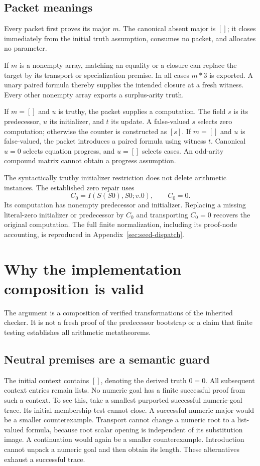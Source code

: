 \documentclass[11pt,letterpaper]{article}
\theoremstyle{definition}\newtheorem{definition}[theorem]{Definition}
\theoremstyle{remark}\newtheorem{remark}[theorem]{Remark}
\begin{document}
\subsection{Packet meanings}

Every packet first proves its major $m$. The canonical absent major is $[]$;
it closes immediately from the initial truth assumption, consumes no packet,
and allocates no parameter.

If $m$ is a nonempty array, matching an equality or a closure can replace
the target by its transport or specialization premise. In all cases $m*3$
is exported. A unary paired formula thereby supplies the intended closure
at a fresh witness. Every other nonempty array exports a surplus-arity truth.

If $m=[]$ and $u$ is truthy, the packet supplies a computation. The field $s$
is its predecessor, $u$ its initializer, and $t$ its update. A false-valued $s$
selects zero computation; otherwise the counter is constructed as $[s]$.
If $m=[]$ and $u$ is false-valued, the packet introduces a paired formula
using witness $t$. Canonical $u=0$ selects equation progress, and $u=[]$
selects cases. An odd-arity compound matrix cannot obtain a progress assumption.

The syntactically truthy initializer restriction does not delete arithmetic
instances. The established zero repair uses
\[
       C_0=I(S(S0),S0;v.0),\qquad C_0=0.
\]
Its computation has nonempty predecessor and initializer. Replacing a missing
literal-zero initializer or predecessor by $C_0$ and transporting $C_0=0$
recovers the original computation. The full finite normalization, including
its proof-node accounting, is reproduced in Appendix~\ref{sec:seed-dispatch}.

\section{Why the implementation composition is valid}
\label{sec:composition}

The argument is a composition of verified transformations of the inherited
checker. It is not a fresh proof of the predecessor bootstrap or a claim that
finite testing establishes all arithmetic metatheorems.

\subsection{Neutral premises are a semantic guard}

The initial context contains $[]$, denoting the derived truth $0=0$.
All subsequent context entries remain lists. No numeric goal has a finite
successful proof from such a context. To see this, take a smallest purported
successful numeric-goal trace. Its initial membership test cannot close.
A successful numeric major would be a smaller counterexample. Transport
cannot change a numeric root to a list-valued formula, because root scalar
opening is independent of its substitution image. A continuation would again
be a smaller counterexample. Introduction cannot unpack a numeric goal and
then obtain its length. These alternatives exhaust a successful trace.
\end{document}
